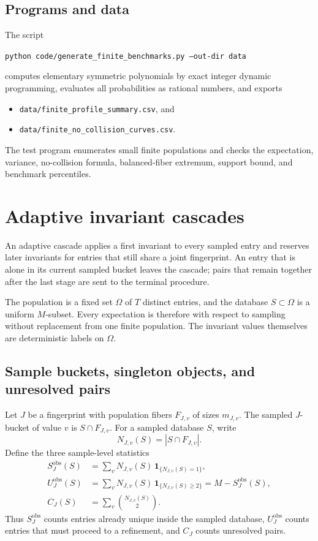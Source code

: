 \documentclass[9pt,twoside]{pnas-new}
\theoremstyle{definition}
\theoremstyle{remark}
\begin{document}
\subsection{Programs and data}
The script
\begin{center}
\texttt{python code/generate\_finite\_benchmarks.py --out-dir data}
\end{center}
computes elementary symmetric polynomials by exact integer dynamic programming, evaluates all probabilities as rational numbers, and exports
\begin{itemize}
 \item \texttt{data/finite\_profile\_summary.csv}, and
 \item \texttt{data/finite\_no\_collision\_curves.csv}.
\end{itemize}
The test program enumerates small finite populations and checks the expectation, variance, no-collision formula, balanced-fiber extremum, support bound, and benchmark percentiles.
\section{Adaptive invariant cascades}
\label{si:cascades}
An adaptive cascade applies a first invariant to every sampled entry and reserves later invariants for entries that still share a joint fingerprint. An entry that is alone in its current sampled bucket leaves the cascade; pairs that remain together after the last stage are sent to the terminal procedure.

The population is a fixed set $\Omega$ of $T$ distinct entries, and the database $S\subset\Omega$ is a uniform $M$-subset.  Every expectation is therefore with respect to sampling without replacement from one finite population.  The invariant values themselves are deterministic labels on $\Omega$.

\subsection{Sample buckets, singleton objects, and unresolved pairs}
Let $J$ be a fingerprint with population fibers $F_{J,v}$ of sizes $m_{J,v}$. The sampled $J$-bucket of value $v$ is $S\cap F_{J,v}$. For a sampled database $S$, write
\[
 N_{J,v}(S)=|S\cap F_{J,v}|.
\]
Define the three sample-level statistics
\begin{align}
 S_J^{\mathrm{obs}}(S)
   &=\sum_v N_{J,v}(S)\,\mathbf 1_{\{N_{J,v}(S)=1\}},
   \label{si:eq:observed-singletons}\\
 U_J^{\mathrm{obs}}(S)
   &=\sum_v N_{J,v}(S)\,\mathbf 1_{\{N_{J,v}(S)\ge2\}}
     =M-S_J^{\mathrm{obs}}(S),
   \label{si:eq:observed-survivors}\\
 C_J(S)
   &=\sum_v\binom{N_{J,v}(S)}2.
   \label{si:eq:observed-pairs}
\end{align}
Thus $S_J^{\mathrm{obs}}$ counts entries already unique inside the sampled database, $U_J^{\mathrm{obs}}$ counts entries that must proceed to a refinement, and $C_J$ counts unresolved pairs.
\end{document}

